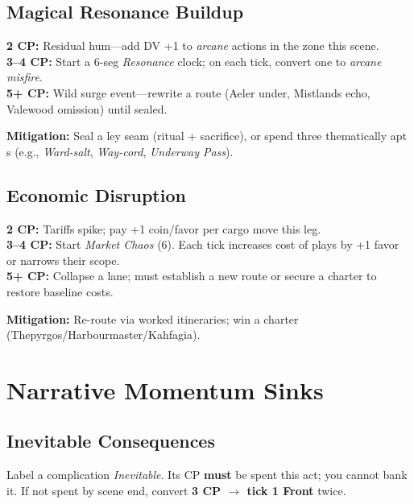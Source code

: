 \subsection{Magical Resonance Buildup}
\begin{tcolorbox}[enhanced,sharp corners,boxrule=.6pt,title={CP Menu}]
\textbf{2 CP:} Residual hum—add DV +1 to \emph{arcane} actions in the zone this scene.\\
\textbf{3--4 CP:} Start a 6-seg \emph{Resonance} clock; on each tick, convert one \SuitClub{} to \emph{arcane misfire}.\\
\textbf{5+ CP:} Wild surge event—rewrite a route (Aeler under, Mistlands echo, Valewood omission) until sealed.
\end{tcolorbox}
\textbf{Mitigation:} Seal a ley seam (ritual + sacrifice), or spend three thematically apt \SuitDiamond{}s (e.g., \emph{Ward-salt}, \emph{Way-cord}, \emph{Underway Pass}).

\subsection{Economic Disruption}
\begin{tcolorbox}[enhanced,sharp corners,boxrule=.6pt,title={CP Menu}]
\textbf{2 CP:} Tariffs spike; pay +1 coin/favor per cargo move this leg.\\
\textbf{3--4 CP:} Start \emph{Market Chaos} (6). Each tick increases cost of \SuitDiamond{} plays by +1 favor or narrows their scope.\\
\textbf{5+ CP:} Collapse a lane; must establish a new route or secure a charter to restore baseline costs.
\end{tcolorbox}
\textbf{Mitigation:} Re-route via worked itineraries; win a charter (Thepyrgos/Harbourmaster/Kahfagia).

\section{Narrative Momentum Sinks}
\subsection{Inevitable Consequences}
\begin{tcolorbox}[enhanced,sharp corners,boxrule=.6pt,title={Rule}]
Label a complication \emph{Inevitable}. Its CP \textbf{must} be spent this act; you cannot bank it. If not spent by scene end, convert \textbf{3 CP $\to$ tick 1 Front} twice.
\end{tcolorbox}

